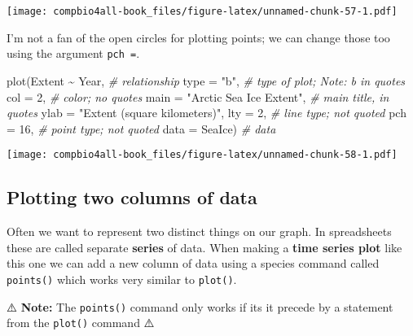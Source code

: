 \documentclass[
]{book}
\newenvironment{Shaded}{\begin{snugshade}}{\end{snugshade}}
\newcommand{\AttributeTok}[1]{\textcolor[rgb]{0.77,0.63,0.00}{#1}}
\newcommand{\CommentTok}[1]{\textcolor[rgb]{0.56,0.35,0.01}{\textit{#1}}}
\newcommand{\DecValTok}[1]{\textcolor[rgb]{0.00,0.00,0.81}{#1}}
\newcommand{\FunctionTok}[1]{\textcolor[rgb]{0.00,0.00,0.00}{#1}}
\newcommand{\NormalTok}[1]{#1}
\newcommand{\SpecialCharTok}[1]{\textcolor[rgb]{0.00,0.00,0.00}{#1}}
\newcommand{\StringTok}[1]{\textcolor[rgb]{0.31,0.60,0.02}{#1}}
\begin{document}
\texttt{[image: compbio4all-book\_files/figure-latex/unnamed-chunk-57-1.pdf]}

I'm not a fan of the open circles for plotting points; we can change those too using the argument \texttt{pch\ =}.

\begin{Shaded}
\begin{Highlighting}[]
\FunctionTok{plot}\NormalTok{(Extent }\SpecialCharTok{\textasciitilde{}}\NormalTok{ Year,  }\CommentTok{\# relationship}
     \AttributeTok{type =} \StringTok{"b"}\NormalTok{,     }\CommentTok{\# type of plot; Note: b in quotes}
     \AttributeTok{col =} \DecValTok{2}\NormalTok{,        }\CommentTok{\# color; no quotes}
     \AttributeTok{main =} \StringTok{"Arctic Sea Ice Extent"}\NormalTok{, }\CommentTok{\# main title, in quotes}
     \AttributeTok{ylab =} \StringTok{"Extent (square kilometers)"}\NormalTok{,}
     \AttributeTok{lty =} \DecValTok{2}\NormalTok{,        }\CommentTok{\# line type; not quoted}
     \AttributeTok{pch =} \DecValTok{16}\NormalTok{,       }\CommentTok{\# point type; not quoted}
     \AttributeTok{data =}\NormalTok{ SeaIce)  }\CommentTok{\# data}
\end{Highlighting}
\end{Shaded}

\texttt{[image: compbio4all-book\_files/figure-latex/unnamed-chunk-58-1.pdf]}

\hypertarget{plotting-two-columns-of-data}{%
\subsection{Plotting two columns of data}\label{plotting-two-columns-of-data}}

Often we want to represent two distinct things on our graph. In spreadsheets these are called separate \textbf{series} of data. When making a \textbf{time series plot} like this one we can add a new column of data using a species command called \texttt{points()} which works very similar to \texttt{plot()}.

⚠️ \textbf{Note:} The \texttt{points()} command only works if its it precede by a statement from the \texttt{plot()} command ⚠️
\end{document}
